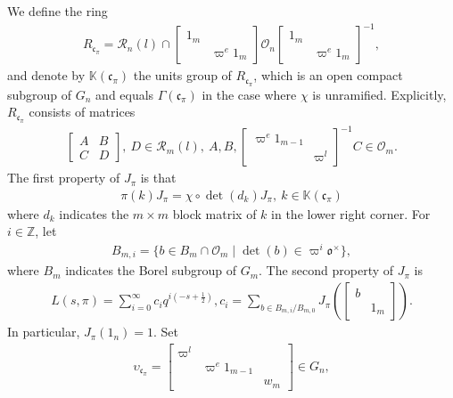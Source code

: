 \documentclass[11pt]{amsart}
\newcommand\Vp{\varpi}%
\newcommand\vp{\varphi}%
\newcommand\oo{\mathfrak{o}}
\newcommand\cf{{\mathfrak{c}}}
\newcommand\Z{{\mathbb{Z}}}
\newcommand\K{{\mathbb{K}}}
\newcommand\Rc{{\mathcal{R}}}
\newcommand\Oc{{\mathcal{O}}}
\newcommand\1{\mathbf{1}}
\newcommand\tm{\times}
\numberwithin{equation}{section}
\begin{document}
We define the ring 
\begin{align*}
R_{\cf_\pi} = \Rc_n(l) \cap \begin{bmatrix}
1_{m}&  \\
& \Vp^{e}1_m
\end{bmatrix}\Oc_{n}\begin{bmatrix}
1_{m}&  \\
& \Vp^{e}1_m
\end{bmatrix}^{-1},
\end{align*} 
and denote by $\K(\cf_\pi)$ the units group of $R_{\cf_\pi}$, which is an open compact subgroup of $G_n$ and equals $\Gamma(\cf_\pi)$ in the case where $\chi$ is unramified.
Explicitly, $R_{\cf_\pi} $ consists of matrices 
\begin{align}
\begin{bmatrix}
A & B  \\
C& D
\end{bmatrix}, \ D \in \Rc_m(l),\ A, B, \begin{bmatrix}
\Vp^e 1_{m-1}&  \\
& \Vp^l
\end{bmatrix}^{-1} C \in \Oc_m. \label{eq:Rc}
\end{align} 
The first property of $J_\pi$ is that
\begin{align*}
\pi(k)J_\pi = \chi \circ \det(d_k) J_\pi, \ k \in \K(\cf_\pi)
\end{align*}
where $d_k$ indicates the $m \tm m$ block matrix of $k$ in the lower right corner.
For $i \in \Z$, let 
\begin{align*}
B_{m,i}= \{b \in B_m \cap \Oc_m \mid \det(b) \in \Vp^i \oo^\tm \},
\end{align*} 
where $B_m$ indicates the Borel subgroup of $G_m$.
The second property of $J_\pi$ is 
\begin{align*}
L(s,\pi) = \sum_{i = 0}^\infty c_i q^{i(-s+\frac{1}{2})}, c_i = \sum_{b \in B_{m,i}/B_{m,0}} J_\pi(\begin{bmatrix}
b &  \\
& 1_m
\end{bmatrix}).
\end{align*} 
In particular, $J_\pi(1_n) = 1$.
Set
\begin{align}
\upsilon_{\cf_\pi} = \begin{bmatrix}
\Vp^l& &  \\
& \Vp^e 1_{m-1}&  \\
& & w_m
\end{bmatrix} \in G_n,
\label{def:ups}
\end{align} 
\end{document}
